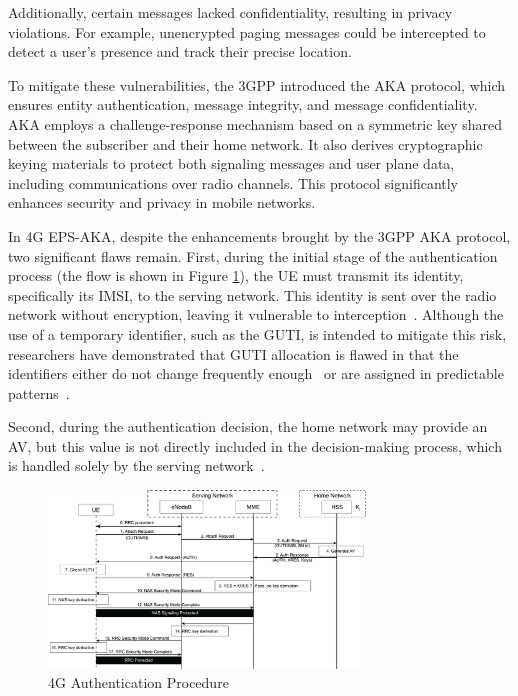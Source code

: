 Additionally, certain messages lacked confidentiality, resulting in privacy violations. For example, unencrypted paging messages could be intercepted to detect a user’s presence and track their precise location. 

To mitigate these vulnerabilities, the 3GPP introduced the \ac{AKA} protocol, which ensures entity authentication, message integrity, and message confidentiality. \ac{AKA} employs a challenge-response mechanism based on a symmetric key shared between the subscriber and their home network. It also derives cryptographic keying materials to protect both signaling messages and user plane data, including communications over radio channels. This protocol significantly enhances security and privacy in mobile networks.

In \ac{4G} \ac{EPS-AKA}, despite the enhancements brought by the 3GPP \ac{AKA} protocol, two significant flaws remain. First, during the initial stage of the authentication process (the flow is shown in Figure \ref{fig:4G-authentication-procedure}), the \ac{UE} must transmit its identity, specifically its \ac{IMSI}, to the serving network. This identity is sent over the radio network without encryption, leaving it vulnerable to interception~\cite{cbl-comp-4G-5g-p3}. Although the use of a temporary identifier, such as the \ac{GUTI}, is intended to mitigate this risk, researchers have demonstrated that \ac{GUTI} allocation is flawed in that the identifiers either do not change frequently enough~\cite{gt-freq} or are assigned in predictable patterns~\cite{gt-pred}.

Second, during the authentication decision, the home network may provide an \ac{AV}, but this value is not directly included in the decision-making process, which is handled solely by the serving network~\cite{cbl-comp-4G-5g-p4}.

\begin{figure}[htbp]
    \centering
    \includegraphics[width=0.75\textwidth]{figs/4G-authentication-procedure.png}
    \caption{\ac{4G} Authentication Procedure}
    \label{fig:4G-authentication-procedure}
\end{figure}


